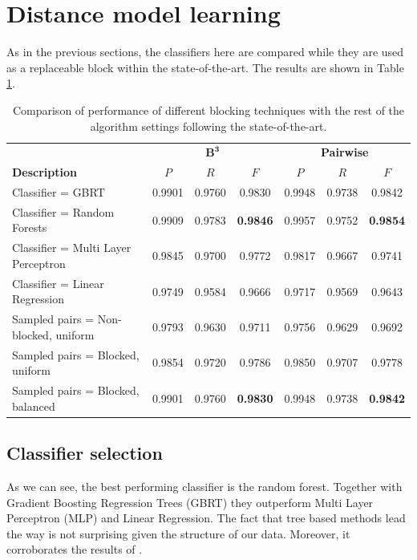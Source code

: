 \documentclass{pracamgr}
\begin{document}
\section{Distance model learning}
As in the previous sections, the classifiers here are compared while they are
used as a replaceable block within the state-of-the-art. The results are
shown in Table \ref{tab:13}.
\begin{table}[H]
\caption{Comparison of performance of different blocking techniques with
the rest of the algorithm settings following the state-of-the-art.}
\centering
\begin{tabular}{|l|c c c | c c c|}
  \hline
                       & \multicolumn{3}{c|}{$\mathbf{B^{3}}$} & \multicolumn{3}{c|}{\textbf{Pairwise}}\\
  \textbf{Description} & $P$ & $R$ & $F$ & $P$ & $R$ & $F$ \\
  \hline
\hline
Classifier = GBRT & 0.9901 & 0.9760 & 0.9830   & 0.9948 & 0.9738 & 0.9842 \\
Classifier = Random Forests & 0.9909 & 0.9783 & \textbf{0.9846}  & 0.9957 & 0.9752 & \textbf{0.9854} \\
Classifier = Multi Layer Perceptron & 0.9845 & 0.9700 & 0.9772 & 0.9817 & 0.9667 & 0.9741 \\
Classifier = Linear Regression & 0.9749 & 0.9584 & 0.9666 & 0.9717 & 0.9569 & 0.9643 \\
\hline
Sampled pairs = Non-blocked, uniform & 0.9793 & 0.9630 & 0.9711  & 0.9756 & 0.9629 & 0.9692 \\
Sampled pairs = Blocked, uniform & 0.9854 & 0.9720 & 0.9786  & 0.9850 & 0.9707 & 0.9778 \\
Sampled pairs = Blocked, balanced & 0.9901 & 0.9760 & \textbf{0.9830}  & 0.9948 & 0.9738 & \textbf{0.9842} \\
\hline
\end{tabular}
\label{tab:13}
\end{table}

\subsection{Classifier selection}
As we can see, the best performing classifier is the random forest. Together
with Gradient Boosting Regression Trees (GBRT) they outperform Multi Layer Perceptron (MLP)
and Linear Regression. The fact that tree based methods lead the way is not surprising
given the structure of our data. Moreover, it corroborates the results of
\citep{treeratpituk2009disambiguating}.
\end{document}
